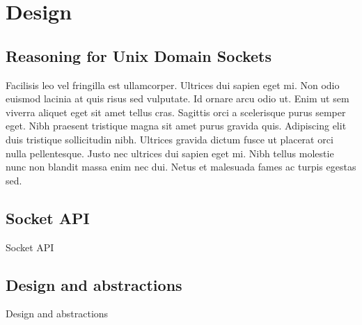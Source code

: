 %
%

\chapter{Design}
\label{cha:design}

\section{Reasoning for Unix Domain Sockets}
Facilisis leo vel fringilla est ullamcorper. Ultrices dui sapien eget mi. Non odio euismod lacinia at quis risus sed vulputate. Id ornare arcu odio ut. Enim ut sem viverra aliquet eget sit amet tellus cras. Sagittis orci a scelerisque purus semper eget. Nibh praesent tristique magna sit amet purus gravida quis. Adipiscing elit duis tristique sollicitudin nibh. Ultrices gravida dictum fusce ut placerat orci nulla pellentesque. Justo nec ultrices dui sapien eget mi. Nibh tellus molestie nunc non blandit massa enim nec dui. Netus et malesuada fames ac turpis egestas sed.

\section{Socket API}
Socket API

\section{Design and abstractions}
Design and abstractions
